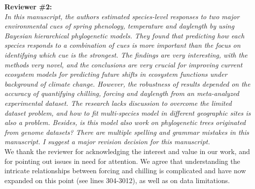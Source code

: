 \documentclass[11pt]{article}
\begin{document}
{\bf Reviewer \#2:}\\


\emph{In this manuscript, the authors estimated species-level responses to two major environmental cues of spring phenology, temperature and daylength by using Bayesian hierarchical phylogenetic models. They found that predicting how each species responds to a combination of cues is more important than the focus on identifying which cue is the strongest. The findings are very interesting, with the methods very novel, and the conclusions are very crucial for improving current ecosystem models for predicting future shifts in ecosystem functions under background of climate change. However, the robustness of results depended on the accuracy of quantifying chilling, forcing and daylength from an meta-analyzed experimental dataset. The research lacks discussion to overcome the limited dataset problem, and how to fit multi-species model in different geographic sites is also a problem. Besides, is this model also work on phylogenetic trees originated from genome datasets? There are multiple spelling and grammar mistakes in this manuscript. I suggest a major revision decision for this manuscript.}\\


We thank the reviewer for acknowledging the interest and value in our work, and for pointing out issues in need for attention. We agree that understanding the intricate relationships between forcing and chilling is complicated and have now expanded on this point (see lines 304-3012), as well as on data limitations.\\ 
\end{document}
